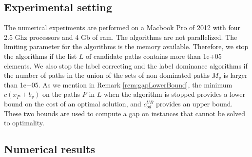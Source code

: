 \documentclass[11pt]{amsart}
\theoremstyle{plain}
\theoremstyle{remark}
\newcommand{\rcost}{c}
\newcommand{\re}{x}
\begin{document}
\subsection{Experimental setting} \label{sub:experimental_setting}

The numerical experiments are performed on a Macbook Pro of 2012 with four 2.5 Ghz processors and 4 Gb of ram. The algorithms are not parallelized. The limiting parameter for the algorithms is the memory available. Therefore, we stop the algorithms if the list $L$ of candidate paths contains more than 1e+05 elements. We also stop the label correcting and the label dominance algorithms if the number of paths in the union of the sets of non dominated paths $M_{v}$ is larger than 1e+05. As we mention in Remark \ref{rem:gapLowerBound}, the minimum $\rcost(\re_{P} + b_{v})$ on the paths $P$ in $L$ when the algorithm is stopped provides a lower bound on the cost of an optimal solution, and $c_{od}^{UB}$ provides an upper bound. These two bounds are used to compute a gap on instances that cannot be solved to optimality. 

\subsection{Numerical results} \label{sub:numerical_results_with_one_constraint}
\end{document}
